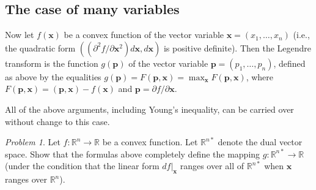 \documentclass[leqno]{report}
\numberwithin{equation}{section}
\theoremstyle{plain}
\theoremstyle{definition}
\theoremstyle{remark}
\theoremstyle{smallcap}
\newtheorem*{prob*}{Problem}
\numberwithin{prob}{section}
\begin{document}
\subsection{The case of many variables}


Now let $f(\mathbf x)$ be a convex function
of the vector variable
$\mathbf x = (x_1, \dots, x_n)$
(i.e., the quadratic form
$\left( (\partial^2 f/\partial \mathbf x^2) d \mathbf x, d\mathbf x \right)$
is positive definite).
%
Then
the Legendre transform is the function $g(\mathbf p)$
of the vector variable
$\mathbf p = (p_1, \dots, p_n)$,
defined as above by the equalities
$g(\mathbf p) = F(\mathbf p, \mathbf x) = \max_\mathbf{x} F(\mathbf p, \mathbf x)$,
where
$F(\mathbf p, \mathbf x) = (\mathbf p, \mathbf x) - f(\mathbf x)$
and
$\mathbf p = \partial f/\partial \mathbf x$.

All of the above arguments, including Young's inequality,
can be carried over without change to this case.

\begin{prob*}
  Let $f: \mathbb R^n \to \mathbb R$
  be a convex function.
  Let $\mathbb R^{n*}$ denote the dual vector space.
  Show that the formulas above completely
  define the mapping $g: \mathbb R^{n*} \to \mathbb R$
  (under the condition that the linear form
  $df|_\mathbf{x}$ ranges over all of $\mathbb R^{n*}$
  when $\mathbf x$ ranges over $\mathbb R^n$).
\end{prob*}
\end{document}
